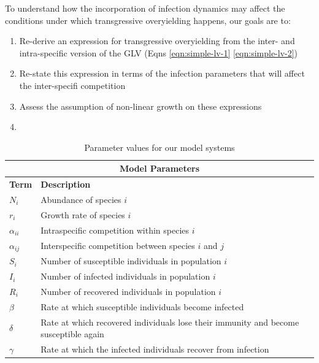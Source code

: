\documentclass[
  letterpaper,
  DIV=11,
  numbers=noendperiod]{scrartcl}
\providecommand{\tightlist}{%
  \setlength{\itemsep}{0pt}\setlength{\parskip}{0pt}}\usepackage{longtable,booktabs,array}
\begin{document}
To understand how the incorporation of infection dynamics may affect the
conditions under which transgressive overyielding happens, our goals are
to:

\begin{enumerate}
\def\labelenumi{\arabic{enumi})}
\tightlist
\item
  Re-derive an expression for transgressive overyielding from the inter-
  and intra-specific version of the GLV (Eqns \ref{eqn:simple-lv-1}
  \ref{eqn:simple-lv-2})
\item
  Re-state this expression in terms of the infection parameters that
  will affect the inter-specifi competition
\item
  Assess the assumption of non-linear growth on these expressions
\item
\end{enumerate}

\begin{table}[hpt]
\centering
\begin{tabular}{ |m{3cm}||m{10cm}|}
     \hline
     \multicolumn{2}{|c|}{Model Parameters} \\
     \hline
     \textbf{Term} & \textbf{Description} \\
     \hline
     $N_i$ & Abundance of species $i$ \\
     $r_i$ & Growth rate of species $i$ \\
     $\alpha_{ii}$ & Intraspecific competition within species $i$ \\
     $\alpha_{ij}$ & Interspecific competition between species $i$ and $j$ \\
     $S_i$ & Number of susceptible individuals in population $i$ \\
     $I_i$ & Number of infected individuals in population $i$ \\
     $R_i$ & Number of recovered individuals in population $i$ \\
     $\beta$ & Rate at which susceptible individuals become infected \\
     $\delta$ & Rate at which recovered individuals lose their immunity and become susceptible again \\
     $\gamma$ & Rate at which the infected individuals recover from infection \\
     \hline
\end{tabular}
\caption{Parameter values for our model systems}
\label{table:parameters}
\end{table}
\end{document}
